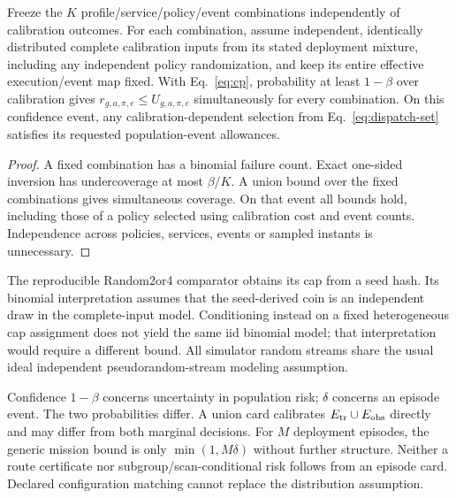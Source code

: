 \begin{theorem}\label{thm:calibration}
Freeze the $K$ profile/service/policy/event combinations independently of calibration outcomes. For each combination, assume independent, identically distributed complete calibration inputs from its stated deployment mixture, including any independent policy randomization, and keep its entire effective execution/event map fixed. With Eq.~\eqref{eq:cp}, probability at least $1-\beta$ over calibration gives $r_{g,a,\pi,e}\le U_{g,a,\pi,e}$ simultaneously for every combination. On this confidence event, any calibration-dependent selection from Eq.~\eqref{eq:dispatch-set} satisfies its requested population-event allowances.
\end{theorem}
\begin{proof}
A fixed combination has a binomial failure count. Exact one-sided inversion has undercoverage at most $\beta/K$. A union bound over the fixed combinations gives simultaneous coverage. On that event all bounds hold, including those of a policy selected using calibration cost and event counts. Independence across policies, services, events or sampled instants is unnecessary.
\end{proof}
The reproducible Random2or4 comparator obtains its cap from a seed hash. Its binomial interpretation assumes that the seed-derived coin is an independent draw in the complete-input model. Conditioning instead on a fixed heterogeneous cap assignment does not yield the same iid binomial model; that interpretation would require a different bound. All simulator random streams share the usual ideal independent pseudorandom-stream modeling assumption.

Confidence $1-\beta$ concerns uncertainty in population risk; $\delta$ concerns an episode event. The two probabilities differ. A union card calibrates $E_{\rm tr}\cup E_{\rm obs}$ directly and may differ from both marginal decisions. For $M$ deployment episodes, the generic mission bound is only $\min(1,M\delta)$ without further structure. Neither a route certificate nor subgroup/scan-conditional risk follows from an episode card. Declared configuration matching cannot replace the distribution assumption.

